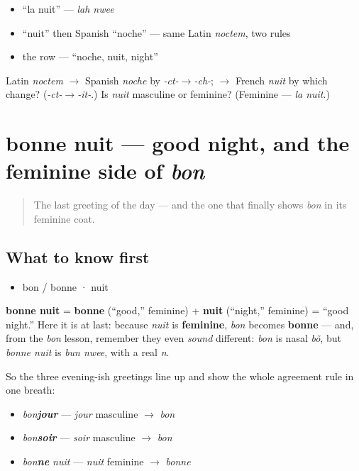 \begin{itemize}
\raggedright
  \item \textquotedblleft{}la nuit\textquotedblright{} — \emph{lah nwee}
  \item \textquotedblleft{}nuit\textquotedblright{} then Spanish \textquotedblleft{}noche\textquotedblright{} — same Latin \emph{noctem}, two rules
  \item the row — \textquotedblleft{}noche, nuit, night\textquotedblright{}
\end{itemize}

\begin{tcolorbox}[breakable,colback=teal!4,colframe=teal!35!black,title={Before you move on}]
Latin \emph{noctem} $\to$ Spanish \emph{noche} by \emph{-ct-$\to$-ch-}; $\to$ French \emph{nuit} by which change? (\emph{-ct-$\to$-it-}.) Is \emph{nuit} masculine or feminine? (Feminine — \emph{la nuit}.)
\end{tcolorbox}
\section[bonne nuit]{bonne nuit — good night, and the feminine side of \emph{bon}}

\label{lesson:FR-C01-bonne-nuit}



\begin{quote}
The last greeting of the day — and the one that finally shows \emph{bon} in its feminine coat.
\end{quote}

\subsection*{What to know first}
\begin{itemize}
\raggedright
  \item bon / bonne · nuit
\end{itemize}

\begin{cousinweb}
\textbf{bonne nuit} = \textbf{bonne} (\textquotedblleft{}good,\textquotedblright{} feminine) + \textbf{nuit} (\textquotedblleft{}night,\textquotedblright{} feminine) = \textquotedblleft{}good night.\textquotedblright{} Here it is at last: because \emph{nuit} is \textbf{feminine}, \emph{bon} becomes \textbf{bonne} — and, from the \emph{bon} lesson, remember they even \emph{sound} different: \emph{bon} is nasal \emph{bõ}, but \emph{bonne nuit} is \emph{bun nwee}, with a real \emph{n}.

So the three evening-ish greetings line up and show the whole agreement rule in one breath:

\begin{itemize}
\raggedright
  \item \emph{bon\textbf{jour}} — \emph{jour} masculine $\to$ \emph{bon}
  \item \emph{bon\textbf{soir}} — \emph{soir} masculine $\to$ \emph{bon}
  \item \emph{bon\textbf{ne} nuit} — \emph{nuit} feminine $\to$ \emph{bonne}
\end{itemize}
\end{cousinweb}

